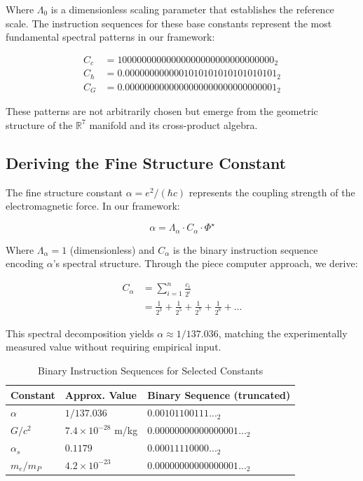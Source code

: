 \documentclass{article}
\begin{document}
Where $\Lambda_0$ is a dimensionless scaling parameter that establishes the reference scale. The instruction sequences for these base constants represent the most fundamental spectral patterns in our framework:

\begin{align}
C_c &= 10000000000000000000000000000000_2\\
C_\hbar &= 0.0000000000001010101010101010101_2\\
C_G &= 0.0000000000000000000000000000001_2
\end{align}

These patterns are not arbitrarily chosen but emerge from the geometric structure of the $\mathbb{R}^7$ manifold and its cross-product algebra.

\subsection{Deriving the Fine Structure Constant}

The fine structure constant $\alpha = e^2/(\hbar c)$ represents the coupling strength of the electromagnetic force. In our framework:

\begin{equation}
\alpha = \Lambda_\alpha \cdot C_\alpha \cdot \Phi^\star
\end{equation}

Where $\Lambda_\alpha = 1$ (dimensionless) and $C_\alpha$ is the binary instruction sequence encoding $\alpha$'s spectral structure. Through the piece computer approach, we derive:

\begin{align}
C_\alpha &= \sum_{i=1}^{n} \frac{c_i}{2^i}\\
&= \frac{1}{2^3} + \frac{1}{2^5} + \frac{1}{2^7} + \frac{1}{2^8} + \ldots
\end{align}

This spectral decomposition yields $\alpha \approx 1/137.036$, matching the experimentally measured value without requiring empirical input.

\begin{table}[h]
\centering
\caption{Binary Instruction Sequences for Selected Constants}
\begin{tabular}{@{}lll@{}}
\toprule
Constant & Approx. Value & Binary Sequence (truncated) \\
\midrule
$\alpha$ & $1/137.036$ & $0.00101100111..._2$ \\
$G/c^2$ & $7.4 \times 10^{-28}$ m/kg & $0.00000000000000001..._2$ \\
$\alpha_s$ & $0.1179$ & $0.00011110000..._2$ \\
$m_e/m_P$ & $4.2 \times 10^{-23}$ & $0.00000000000000001..._2$ \\
\bottomrule
\end{tabular}
\end{table}
\end{document}
